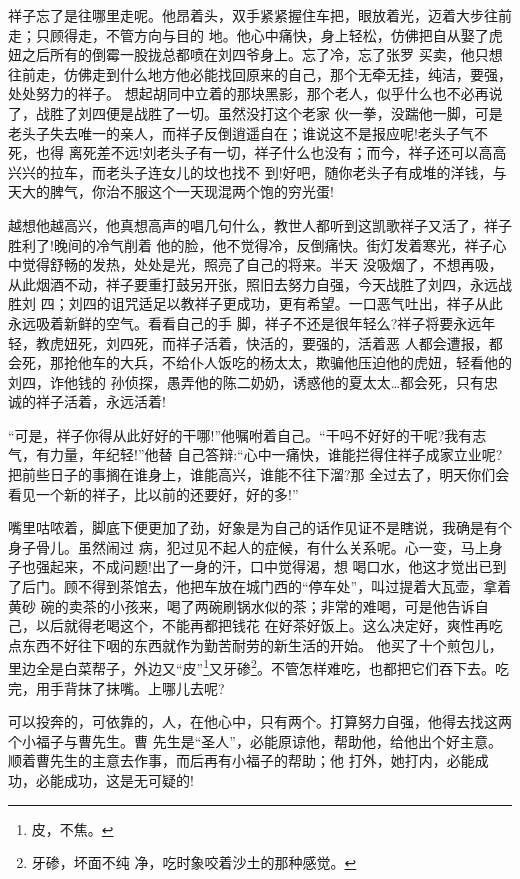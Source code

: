 \documentclass[11pt,a4paper,onecolumn]{article}
\begin{document}
祥子忘了是往哪里走呢。他昂着头，双手紧紧握住车把，眼放着光，迈着大步往前走；只顾得走，不管方向与目的
地。他心中痛快，身上轻松，仿佛把自从娶了虎妞之后所有的倒霉一股拢总都喷在刘四爷身上。忘了冷，忘了张罗
买卖，他只想往前走，仿佛走到什么地方他必能找回原来的自己，那个无牵无挂，纯洁，要强，处处努力的祥子。
想起胡同中立着的那块黑影，那个老人，似乎什么也不必再说了，战胜了刘四便是战胜了一切。虽然没打这个老家
伙一拳，没踹他一脚，可是老头子失去唯一的亲人，而祥子反倒逍遥自在；谁说这不是报应呢!老头子气不死，也得
离死差不远!刘老头子有一切，祥子什么也没有；而今，祥子还可以高高兴兴的拉车，而老头子连女儿的坟也找不
到!好吧，随你老头子有成堆的洋钱，与天大的脾气，你治不服这个一天现混两个饱的穷光蛋!

越想他越高兴，他真想高声的唱几句什么，教世人都听到这凯歌\myrule 祥子又活了，祥子胜利了!晚间的冷气削着
他的脸，他不觉得冷，反倒痛快。街灯发着寒光，祥子心中觉得舒畅的发热，处处是光，照亮了自己的将来。半天
没吸烟了，不想再吸，从此烟酒不动，祥子要重打鼓另开张，照旧去努力自强，今天战胜了刘四，永远战胜刘
四；刘四的诅咒适足以教祥子更成功，更有希望。一口恶气吐出，祥子从此永远吸着新鲜的空气。看看自己的手
脚，祥子不还是很年轻么?祥子将要永远年轻，教虎妞死，刘四死，而祥子活着，快活的，要强的，活着\myrule 恶
人都会遭报，都会死，那抢他车的大兵，不给仆人饭吃的杨太太，欺骗他压迫他的虎妞，轻看他的刘四，诈他钱的
孙侦探，愚弄他的陈二奶奶，诱惑他的夏太太\ldots 都会死，只有忠诚的祥子活着，永远活着!

``可是，祥子你得从此好好的干哪!''他嘱咐着自己。``干吗不好好的干呢?我有志气，有力量，年纪轻!''他替
自己答辩:``心中一痛快，谁能拦得住祥子成家立业呢?把前些日子的事搁在谁身上，谁能高兴，谁能不往下溜?那
全过去了，明天你们会看见一个新的祥子，比以前的还要好，好的多!''

嘴里咕哝着，脚底下便更加了劲，好象是为自己的话作见证\myrule 不是瞎说，我确是有个身子骨儿。虽然闹过
病，犯过见不起人的症候，有什么关系呢。心一变，马上身子也强起来，不成问题!出了一身的汗，口中觉得渴，想
喝口水，他这才觉出已到了后门。顾不得到茶馆去，他把车放在城门西的``停车处''，叫过提着大瓦壶，拿着黄砂
碗的卖茶的小孩来，喝了两碗刷锅水似的茶；非常的难喝，可是他告诉自己，以后就得老喝这个，不能再都把钱花
在好茶好饭上。这么决定好，爽性再吃点东西\myrule 不好往下咽的东西\myrule 就作为勤苦耐劳的新生活的开始。
他买了十个煎包儿，里边全是白菜帮子，外边又``皮''\footnote{皮，不焦。}又牙碜\footnote{牙碜，坏面不纯
  净，吃时象咬着沙土的那种感觉。}。不管怎样难吃，也都把它们吞下去。吃完，用手背抹了抹嘴。上哪儿去呢?

可以投奔的，可依靠的，人，在他心中，只有两个。打算努力自强，他得去找这两个\myrule 小福子与曹先生。曹
先生是``圣人''，必能原谅他，帮助他，给他出个好主意。顺着曹先生的主意去作事，而后再有小福子的帮助；他
打外，她打内，必能成功，必能成功，这是无可疑的!
\end{document}

